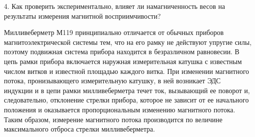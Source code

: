 \documentclass[a4paper,14pt]{article}
\begin{document}
\vspace{5mm}

4. Как проверить экспериментально, влияет ли намагниченность весов на результаты измерения магнитной восприимчивости?

\vspace{5mm}



\vspace{5mm}

\vspace{5mm}

Милливеберметр М119 принципиально отличается от
обычных приборов магнитоэлектрической системы тем, что на его рамку не действуют упругие
силы, поэтому подвижная система прибора находится в безразличном
равновесии.
В цепь рамки прибора
включается наружная измерительная катушка с известным
числом витков и известной
площадью каждого витка. При
изменении магнитного потока,
пронизывающего измерительную
катушку, в ней возникает ЭДС
индукции и в цепи рамки
милливеберметра течет ток, вызывающий ее поворот и, следовательно, отклонение стрелки
прибора, которое не зависит от ее начального положения и оказывается пропорциональным
изменению магнитного потока. Таким образом, измерение магнитного потока производится по величине максимального отброса стрелки милливеберметра.
\end{document}
